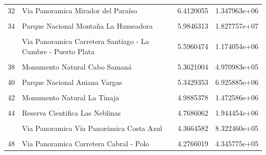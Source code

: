 \documentclass[10pt,landscape,a3paper]{article}
\begin{document}
\begin{longtable}[t]{llrr}
32 & Via Panoramica Mirador del Paraíso & 6.4120055 & 1.347963e+06\\
\cellcolor{lightgray}{33} & \cellcolor{lightgray}{Parque Nacional Saltos de la Jalda} & \cellcolor{lightgray}{6.3589184} & \cellcolor{lightgray}{2.316788e+06}\\
34 & Parque Nacional Montaña La Humeadora & 5.9846313 & 1.827757e+07\\
\cellcolor{lightgray}{35} & \cellcolor{lightgray}{Monumento Natural Loma Isabel de Torres} & \cellcolor{lightgray}{5.8831353} & \cellcolor{lightgray}{9.768897e+05}\\
\addlinespace
36 & Via Panoramica Carretera Santiago - La Cumbre - Puerto Plata & 5.5960474 & 1.174054e+06\\
\cellcolor{lightgray}{37} & \cellcolor{lightgray}{Parque Nacional Valle Nuevo} & \cellcolor{lightgray}{5.3641486} & \cellcolor{lightgray}{4.860623e+07}\\
38 & Monumento Natural Cabo Samaná & 5.3621004 & 4.970983e+05\\
\cellcolor{lightgray}{39} & \cellcolor{lightgray}{Reserva Biológica Loma Charco Azul} & \cellcolor{lightgray}{5.3589984} & \cellcolor{lightgray}{9.334805e+06}\\
40 & Parque Nacional Aniana Vargas & 5.3429353 & 6.925885e+06\\
\addlinespace
\cellcolor{lightgray}{41} & \cellcolor{lightgray}{Via Panoramica Carretera Bayacanes-Jarabacoa} & \cellcolor{lightgray}{5.1178604} & \cellcolor{lightgray}{8.304956e+05}\\
42 & Monumento Natural La Tinaja & 4.9885378 & 1.472586e+06\\
\cellcolor{lightgray}{43} & \cellcolor{lightgray}{Via Panoramica Mirador del Atlántico} & \cellcolor{lightgray}{4.8032548} & \cellcolor{lightgray}{5.819625e+05}\\
44 & Reserva Cientifica Las Neblinas & 4.7686062 & 1.944454e+06\\
\cellcolor{lightgray}{45} & \cellcolor{lightgray}{Refugio de Vida Silvestre Río Soco} & \cellcolor{lightgray}{4.4230649} & \cellcolor{lightgray}{5.203307e+05}\\
\addlinespace
46 & Via Panoramica Vía Panorámica Costa Azul & 4.3664582 & 8.322460e+05\\
\cellcolor{lightgray}{47} & \cellcolor{lightgray}{Reserva Forestal Loma El 20} & \cellcolor{lightgray}{4.2928178} & \cellcolor{lightgray}{2.147130e+06}\\
48 & Via Panoramica Carretera Cabral - Polo & 4.2766019 & 4.345775e+05\\

\end{longtable}
\end{document}
